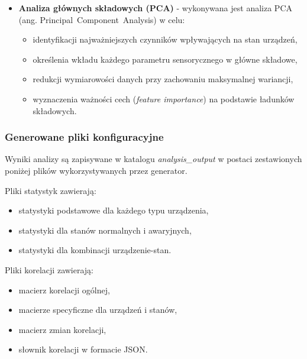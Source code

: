 \begin{itemize}
    \item \textbf{Analiza głównych składowych (PCA)} - wykonywana jest analiza PCA \\ (ang. \mbox{Principal Component Analysis}) \cite{jolliffe_pca} w celu:
    
\begin{itemize}
    \item identyfikacji najważniejszych czynników wpływających na stan urządzeń,
    \item określenia wkładu każdego parametru sensorycznego w główne składowe,
    \item redukcji wymiarowości danych przy zachowaniu maksymalnej wariancji,
    \item wyznaczenia ważności cech (\textit{feature importance}) na podstawie ładunków składowych.
\end{itemize}

\end{itemize}

\newpage

\subsubsection{Generowane pliki konfiguracyjne}

Wyniki analizy są zapisywane w katalogu \textit{analysis\_output} w postaci zestawionych poniżej plików wykorzystywanych przez generator.

\vspace{0.3em}

Pliki statystyk zawierają:
\begin{itemize}
    \item statystyki podstawowe dla każdego typu urządzenia,
    \item statystyki dla stanów normalnych i awaryjnych,
    \item statystyki dla kombinacji urządzenie-stan.
\end{itemize}

\vspace{0.3em}

Pliki korelacji zawierają:
\begin{itemize}
    \item macierz korelacji ogólnej,
    \item macierze specyficzne dla urządzeń i stanów,
    \item macierz zmian korelacji,
    \item słownik korelacji w formacie JSON.
\end{itemize}

